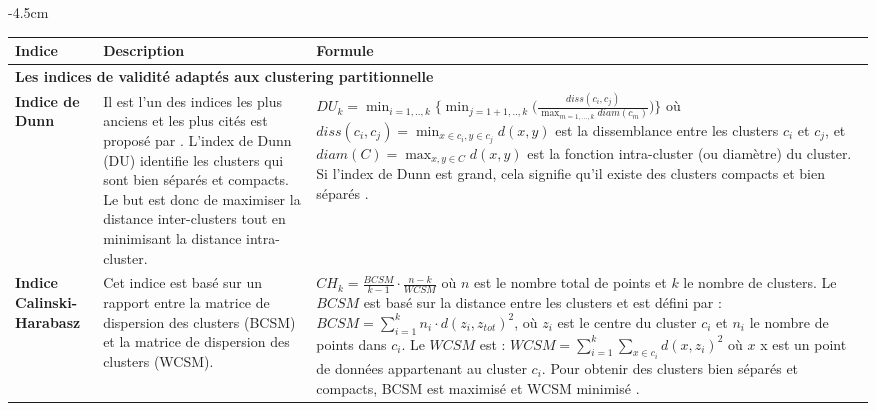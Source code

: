 \begin{table}[H]
	\centering
	\addtolength{\leftskip} {-4.5cm}
	\addtolength{\rightskip}{-4cm}
	\begin{tabular}{|m{2cm}|m{5cm}|m{12cm}|}
	\hline
	\rowcolor{blueforest}
	\color{white} \textbf{Indice} & \color{white} \textbf{Description} & \color{white} \textbf{Formule}  \\
	\hline\hline
	\multicolumn{3}{|m{19cm}|}{\centering \textbf{Les indices de validité adaptés aux clustering partitionnelle} }\\ \hline
	\textbf{Indice de Dunn}  &
	Il est l'un des indices les plus anciens et les plus cités est proposé par \cite{dunn1974well}. L'index de Dunn (DU) identifie les clusters qui sont bien séparés et compacts. Le but est donc de maximiser la distance inter-clusters tout en minimisant la distance intra-cluster. &  \(\displaystyle DU_{k} = \min_{i=1,..,k} \Bigg \{ \min_{j=1+1,..,k} \Bigg ( \frac{diss(c_{i},c_{j})}{\max_{m=1,...,k}diam(c_{m})} \Bigg ) \Bigg \} \) \newline \newline où \(\displaystyle diss(c_{i},c_{j}) = \min_{x \in c_{i},y \in c_{j}}d(x,y) \) est la dissemblance entre les clusters \(\displaystyle c_{i} \) et \(\displaystyle c_{j}  \), et \(\displaystyle diam(C) = \max_{x,y \in C}d(x,y) \) est la fonction intra-cluster (ou diamètre) du cluster. Si l'index de Dunn est grand, cela signifie qu'il existe des clusters compacts et bien séparés \cite{Saitta2008}. \\ \hline
	\textbf{Indice Calinski-Harabasz}  &
	Cet indice \cite{calinski1974dendrite} est basé sur un rapport entre la matrice de dispersion des clusters (BCSM) et la matrice de dispersion des clusters (WCSM). &  \(\displaystyle CH_{k} = \frac{BCSM}{k-1} \cdot \frac{n-k}{WCSM} \) \newline où \(\displaystyle n  \) est le nombre total de points et \(\displaystyle k  \) le nombre de clusters. Le \(\displaystyle BCSM   \) est basé sur la distance entre les clusters et est défini par : \(\displaystyle BCSM = \sum_{i=1}^{k} n_{i} \cdot d(z_{i},z_{tot})^{2}  \), où \(\displaystyle z_{i}  \) est le centre du cluster \(\displaystyle c_{i}  \) et \(\displaystyle n_{i}  \) le nombre de points dans \(\displaystyle c_{i}  \). Le \(\displaystyle WCSM  \)  est : \(\displaystyle WCSM = \sum_{i=1}^{k} \sum_{x \in c_{i}} d(x,z_{i})^{2}  \) où \(\displaystyle x  \) x est un point de données appartenant au cluster \(\displaystyle c_{i}  \). Pour obtenir des clusters bien séparés et compacts, BCSM est maximisé et WCSM minimisé \cite{Saitta2008}. \\ \hline

\end{tabular}
\end{table}
